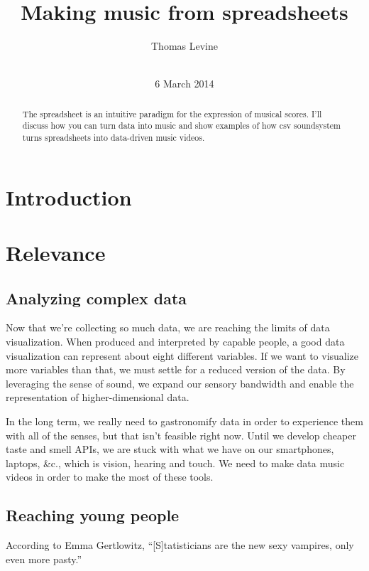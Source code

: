 \documentclass{acm_proc_article-sp}
\begin{document}
\title{Making music from spreadsheets}
\author{
\alignauthor
Thomas Levine\\
       \\
}
\date{6 March 2014}
\maketitle
\begin{abstract}
The spreadsheet is an intuitive paradigm for the expression of musical
scores. I'll discuss how you can turn data into music and show examples of
how csv soundsystem turns spreadsheets into data-driven music videos.
\end{abstract}
\section{Introduction}

\section{Relevance}


\subsection{Analyzing complex data}
Now that we're collecting so much data, we are reaching the limits of
data visualization. When produced and interpreted by capable people,
a good data visualization can represent about eight different variables.
If we want to visualize more variables than that, we must settle for
a reduced version of the data. By leveraging the sense of sound,
we expand our sensory bandwidth and enable the representation of
higher-dimensional data.

In the long term, we really need to gastronomify data in order to experience
them with all of the senses, but that isn't feasible right now.
Until we develop cheaper taste and smell APIs, we are stuck with what we have
on our smartphones, laptops, &c., which is vision, hearing and touch. We need
to make data music videos in order to make the most of these tools.

\subsection{Reaching young people}
According to Emma Gertlowitz\cite{emma},
``[S]tatisticians are the new sexy vampires, only even more pasty.''
\end{document}

